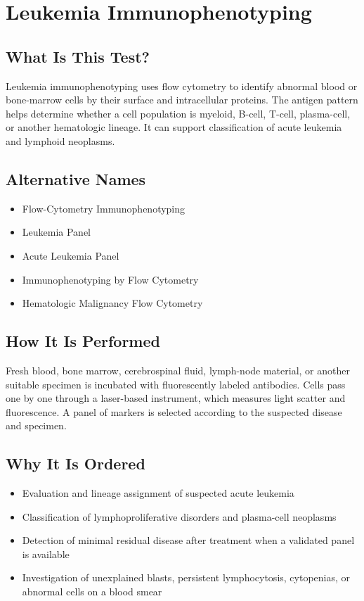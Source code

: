 \chapter{Leukemia Immunophenotyping}

\section*{What Is This Test?}
Leukemia immunophenotyping uses flow cytometry to identify abnormal blood or bone-marrow cells by their surface and intracellular proteins. The antigen pattern helps determine whether a cell population is myeloid, B-cell, T-cell, plasma-cell, or another hematologic lineage. It can support classification of acute leukemia and lymphoid neoplasms.

\section*{Alternative Names}
\begin{itemize}
  \item Flow-Cytometry Immunophenotyping
  \item Leukemia Panel
  \item Acute Leukemia Panel
  \item Immunophenotyping by Flow Cytometry
  \item Hematologic Malignancy Flow Cytometry
\end{itemize}
\section*{How It Is Performed}
Fresh blood, bone marrow, cerebrospinal fluid, lymph-node material, or another suitable specimen is incubated with fluorescently labeled antibodies. Cells pass one by one through a laser-based instrument, which measures light scatter and fluorescence. A panel of markers is selected according to the suspected disease and specimen.

\section*{Why It Is Ordered}
\begin{itemize}
  \item Evaluation and lineage assignment of suspected acute leukemia
  \item Classification of lymphoproliferative disorders and plasma-cell neoplasms
  \item Detection of minimal residual disease after treatment when a validated panel is available
  \item Investigation of unexplained blasts, persistent lymphocytosis, cytopenias, or abnormal cells on a blood smear
\end{itemize}

